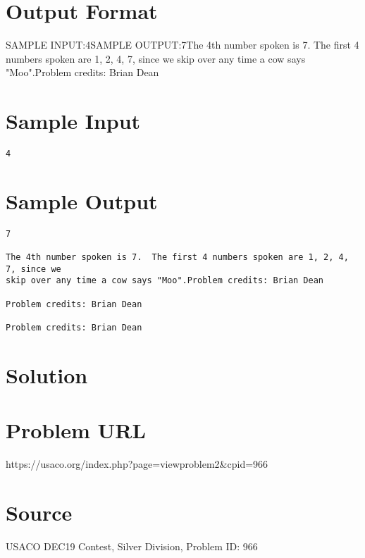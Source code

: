 \documentclass[12pt]{article}
\begin{document}
\section*{Output Format}
SAMPLE INPUT:4SAMPLE OUTPUT:7The 4th number spoken is 7.  The first 4 numbers spoken are 1, 2, 4, 7, since we
skip over any time a cow says "Moo".Problem credits: Brian Dean

\section*{Sample Input}
\begin{verbatim}
4
\end{verbatim}

\section*{Sample Output}
\begin{verbatim}
7

The 4th number spoken is 7.  The first 4 numbers spoken are 1, 2, 4, 7, since we
skip over any time a cow says "Moo".Problem credits: Brian Dean

Problem credits: Brian Dean

Problem credits: Brian Dean
\end{verbatim}

\section*{Solution}


\section*{Problem URL}
https://usaco.org/index.php?page=viewproblem2&cpid=966

\section*{Source}
USACO DEC19 Contest, Silver Division, Problem ID: 966
\end{document}
